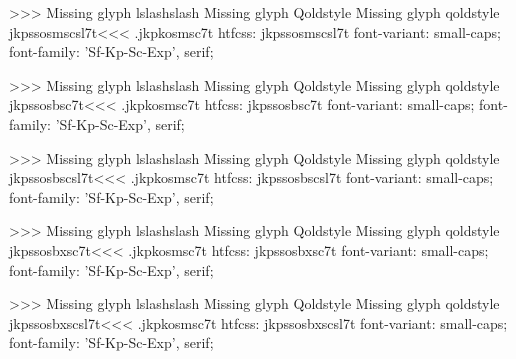>>>
Missing glyph	lslashslash
Missing glyph	Qoldstyle
Missing glyph	qoldstyle
\<jkpssosmscsl7t\><<<
.jkpkosmsc7t
htfcss:  jkpssosmscsl7t  font-variant: small-caps; font-family: 'Sf-Kp-Sc-Exp', serif;

>>>
Missing glyph	lslashslash
Missing glyph	Qoldstyle
Missing glyph	qoldstyle
\<jkpssosbsc7t\><<<
.jkpkosmsc7t
htfcss:  jkpssosbsc7t  font-variant: small-caps; font-family: 'Sf-Kp-Sc-Exp', serif;

>>>
Missing glyph	lslashslash
Missing glyph	Qoldstyle
Missing glyph	qoldstyle
\<jkpssosbscsl7t\><<<
.jkpkosmsc7t
htfcss:  jkpssosbscsl7t  font-variant: small-caps; font-family: 'Sf-Kp-Sc-Exp', serif;

>>>
Missing glyph	lslashslash
Missing glyph	Qoldstyle
Missing glyph	qoldstyle
\<jkpssosbxsc7t\><<<
.jkpkosmsc7t
htfcss:  jkpssosbxsc7t  font-variant: small-caps; font-family: 'Sf-Kp-Sc-Exp', serif;

>>>
Missing glyph	lslashslash
Missing glyph	Qoldstyle
Missing glyph	qoldstyle
\<jkpssosbxscsl7t\><<<
.jkpkosmsc7t
htfcss:  jkpssosbxscsl7t  font-variant: small-caps; font-family: 'Sf-Kp-Sc-Exp', serif;


